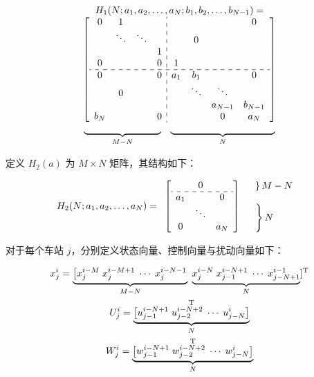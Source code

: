 \begin{equation*}	
	\begin{array}{cccccccc}
		\setlength{\arraycolsep}{0.8mm}
		H_{1}\!\left(N; a_1, a_2, \dots, a_N ; b_1, b_2, \dots, b_{N-1}\right)=\\
		\left[
		\begin{array}{cccc:cccc}
			0&1& & & & & &0 \\
			&\ddots&\ddots& & &0& &\\
			& & &1& & & & \\
			0& & &0&1& & & \\ 
			\hdashline
			0& & &0&a_1&b_1& &0 \\
			& 0&& & &\ddots&\ddots& \\
			&  & && & &a_{N-1}&b_{N-1}\\
			b_N& & &0 & & &0&a_{N}\\
		\end{array}
		\right] \\

		\begin{array}{cc}
			\underbrace{\rule{28mm}{0mm}}_{M-N}&  
			\underbrace{\rule{38mm}{0mm}}_{N}
		\end{array}
	\end{array}
\end{equation*}

定义 $H_{2}(a)$ 为 $M \times N$ 矩阵，其结构如下：

\begin{equation*}
	H_{2}\!\left(N; a_1, a_2, \dots, a_N\right)=
	\begin{array}{ccc}
		\left[
		\begin{array}{ccc}
			 &0& \\
   			\hdashline
			a_1& &0\\ 
			&\ddots& \\
			0& &a_N\\
		\end{array}
		\right]
		&  
		\begin{array}{cc}
			\left.\rule{0mm}{2mm}\right\}M-N \\ \hfill
			\\
			\left.\rule{0mm}{6mm}\right\}N \hfill
		\end{array}
	\end{array}
\end{equation*}

对于每个车站 $j$，分别定义状态向量、控制向量与扰动向量如下：

\begin{gather}
	x_{j}^{i}=\underbrace{\left[x_{j}^{i-M}\; x_{j}^{i-M+1}\; \cdots\; x_{j}^{i-N-1}\right.}_{M-N}\;
	\underbrace{x_{j}^{i-N}\; x_{j-1}^{i-N+1}\; \cdots\; x_{j-N+1}^{i-1}}_{N}]^{\mathrm{T}} \notag \\ 
	U_{j}^{i}=\underbrace{\left[u_{j-1}^{i-N+1}\; u_{j-2}^{i-N+2}\; \cdots\; u_{j-N}^{i}\right]}_{N}^{\mathrm{T}} \notag \\ 
	W_{j}^{i}=\underbrace{\left[w_{j-1}^{i-N+1}\; w_{j-2}^{i-N+2}\; \cdots\; w_{j-N}^{i}\right]}_{N}^{\mathrm{T}}
	\label{eq10}
\end{gather}

